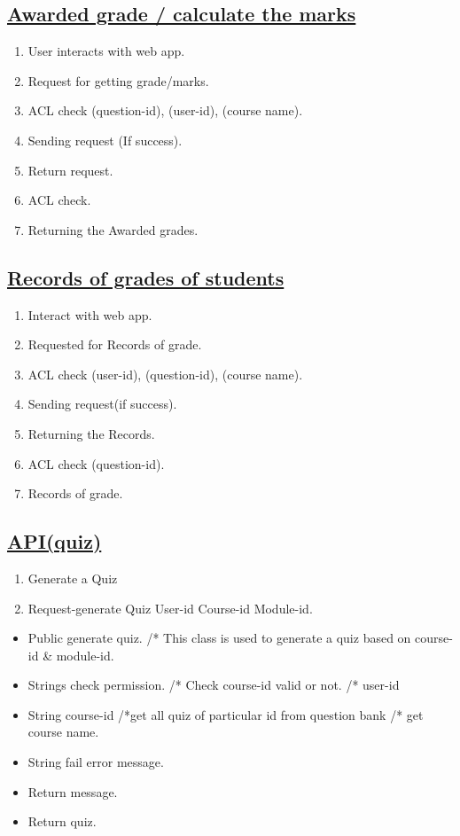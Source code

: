\documentclass{article}
\begin{document}
\subsection*{\underline{Awarded grade / calculate the marks}}
\begin{enumerate}
\item User interacts with web app.
\item Request for getting grade/marks.
\item ACL check (question-id), (user-id), (course name).
\item Sending request (If success).
\item Return request.
\item ACL check.
\item Returning the Awarded grades.
\begin{center}

\label{figure:Awarded_Quiz.latex}
\end{center}
\end{enumerate}
\subsection*{\underline{Records of grades of students}}
\begin{enumerate}
\item Interact with web app.
\item Requested for Records of grade.
\item ACL check (user-id), (question-id), (course name).
\item Sending request(if success).
\item Returning the Records.
\item ACL check (question-id).
\item Records of grade.
\end{enumerate}

\subsection*{\underline{API(quiz)}}
\begin{enumerate}
\item Generate a Quiz \\
\item Request-generate Quiz User-id Course-id Module-id.
\end{enumerate}
\begin{itemize}
\item Public generate quiz.
      /* This class is used to generate a quiz based on course-id \& module-id.
\item Strings check permission.
      /* Check course-id valid or not.
      /* user-id
\item String course-id {/*get all quiz of particular id from question bank}
      /* get course name.
\item String fail error message.
\item Return message.
\item Return quiz.
\end{itemize}
\end{document}
